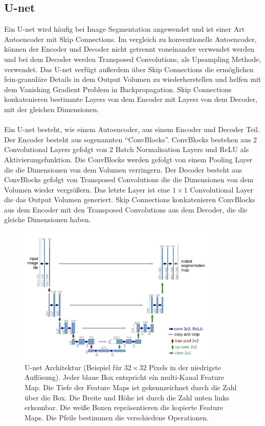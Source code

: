 \subsection{U-net}
Ein U-net wird häufig bei Image Segmentation angewendet und ist einer Art Autoencoder mit Skip Connections. Im vergleich zu konventionelle Autoencoder, können
der Encoder und Decoder nicht getrennt voneinander verwendet werden und bei dem Decoder werden Transposed Convolutions, als Upsampling 
Methode, verwendet. Das U-net verfügt außerdem über Skip Connections die ermöglichen fein-granuläre Details in dem Output Volumen zu 
wiederherstellen und helfen mit dem Vanishing Gradient Problem in Backpropagation. Skip Connections konkatenieren bestimmte Layers von dem
Encoder mit Layers von dem Decoder, mit der gleichen Dimensionen.
\\
\\
Ein U-net besteht, wie einem Autoencoder, aus einem Encoder und Decoder Teil. Der Encoder besteht aus sogenannten ``ConvBlocks''. ConvBlocks
bestehen aus 2 Convolutional Layers gefolgt von 2 Batch Normalisation Layers und ReLU als Aktivierungsfunktion. Die ConvBlocks werden gefolgt
von einem Pooling Layer die die Dimensionen von dem Volumen verringern. Der Decoder besteht aus ConvBlocks gefolgt von Transposed Convolutions
die die Dimensionen von dem Volumen wieder vergrößern. Das letzte Layer ist eine $1 \times 1$ Convolutional Layer die das Output Volumen generiert.
Skip Connections konkatenieren ConvBlocks aus dem Encoder mit den Transposed Convolutions aus dem Decoder, die die gleiche Dimensionen haben.

\begin{figure}[H]
  \centering
  \includegraphics[width=0.85\textwidth]{resources/networks/unet.png}
  \caption{
    U-net Architektur (Beispiel für $32 \times 32$ Pixels in der niedrigste Auflösung). Jeder blaue Box entspricht ein multi-Kanal Feature Map.
    Die Tiefe der Feature Maps ist gekennzeichnet durch die Zahl über die Box. Die Breite und Höhe ist durch die Zahl unten links erkennbar.
    Die weiße Boxen repräsentieren die kopierte Feature Maps. Die Pfeile bestimmen die verschiedene Operationen.
    \cite{ronneberger2015unet}
  }
  \label{image:unet}
\end{figure}

